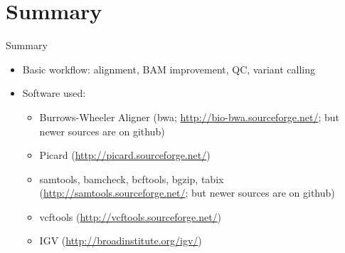 \documentclass{beamer}
\begin{document}
\section*{Summary}

\begin{frame}{Summary}

  \begin{itemize}
  \item
    Basic workflow: alignment, BAM improvement, QC, variant calling
  \item
    Software used: 
    \begin{itemize}
    \item Burrows-Wheeler Aligner (bwa; \url{http://bio-bwa.sourceforge.net/}; but newer sources are on github)
    \item Picard (\url{http://picard.sourceforge.net/})
    \item samtools, bamcheck, bcftools, bgzip, tabix (\url{http://samtools.sourceforge.net/}; but newer sources are on github)
    \item vcftools (\url{http://vcftools.sourceforge.net/})
    \item IGV (\url{http://broadinstitute.org/igv/})
    \end{itemize}
  \end{itemize}
  
\end{frame}
\end{document}
